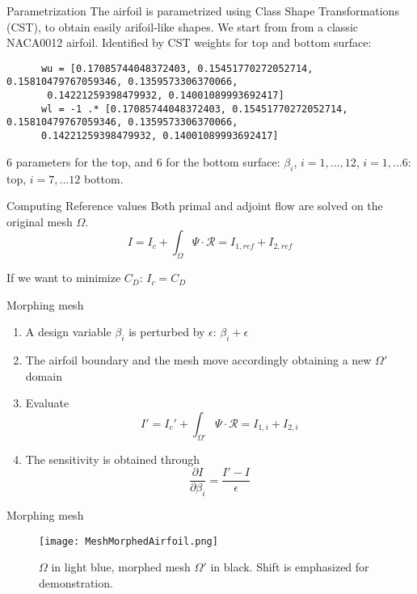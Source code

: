 \begin{frame}[fragile]{Parametrization}
    The airfoil is parametrized using Class Shape Transformations (CST), to obtain easily arifoil-like shapes.
    We start from from a classic NACA0012 airfoil.
    Identified by CST weights for top and bottom surface:
    \begin{verbatim}
      wu = [0.17085744048372403, 0.15451770272052714, 0.15810479767059346, 0.1359573306370066,
       0.14221259398479932, 0.14001089993692417]
      wl = -1 .* [0.17085744048372403, 0.15451770272052714, 0.15810479767059346, 0.1359573306370066, 
      0.14221259398479932, 0.14001089993692417]
    \end{verbatim}
    6 parameters for the top, and 6 for the bottom surface: $\beta_i$, $i=1,...,12$, $i=1,...6$: top, $i=7,...12$ bottom.
    
\end{frame}

\begin{frame}{Computing Reference values}
Both primal and adjoint flow are solved on the original mesh $\Omega$.
$$I = I_c + \int_\Omega\Psi\cdot\mathcal{R} = I_{1,ref}+I_{2,ref} $$

If we want to minimize $C_D$: $I_c=C_D$
\end{frame}


\begin{frame}{Morphing mesh}
  \begin{enumerate}
    \item A design variable $\beta_i$ is perturbed by $\epsilon$:  $\beta_i+\epsilon$ 
    \item The airfoil boundary and the mesh move accordingly obtaining a new $\Omega'$ domain
    \item Evaluate $$I' = I_c' + \int_{\Omega'}\Psi\cdot\mathcal{R} = I_{1,i}+I_{2,i} $$
    \item The sensitivity is obtained through
      $$ \dfrac{\partial I }{\partial \beta _ i} = \dfrac{I'-I}{\epsilon}$$
\end{enumerate}

\end{frame}



\begin{frame}{Morphing mesh}
  \begin{figure}[h]
     \texttt{[image: MeshMorphedAirfoil.png]}
    \caption{$\Omega$ in light blue, morphed mesh $\Omega'$ in black. Shift is emphasized for demonstration.}
    \end{figure} 
\end{frame}

